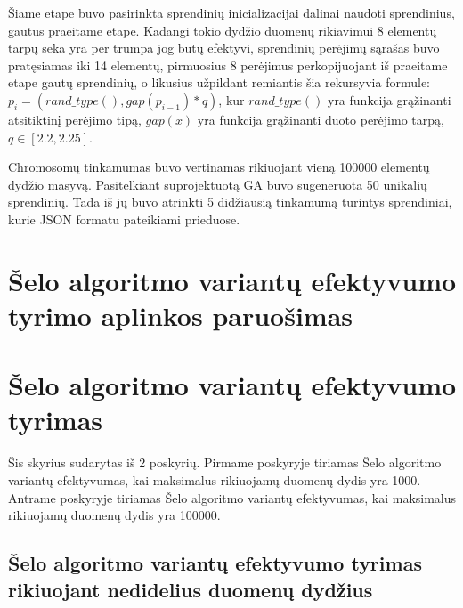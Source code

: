 \documentclass{VUMIFInfKursinis}
\begin{document}
Šiame etape buvo pasirinkta sprendinių inicializacijai dalinai naudoti sprendinius, gautus praeitame etape.
Kadangi tokio dydžio duomenų rikiavimui 8 elementų tarpų seka yra per trumpa jog būtų efektyvi,
sprendinių perėjimų sąrašas buvo pratęsiamas iki 14 elementų, pirmuosius 8 perėjimus perkopijuojant iš praeitame etape gautų sprendinių,
o likusius užpildant remiantis šia rekursyvia formule: $p_i = (rand\_type(), gap(p_{i-1}) * q)$,
kur $rand\_type()$ yra funkcija grąžinanti atsitiktinį perėjimo tipą, $gap(x)$ yra funkcija grąžinanti duoto perėjimo tarpą, $q \in \left[2.2, 2.25\right]$.

Chromosomų tinkamumas buvo vertinamas rikiuojant vieną 100000 elementų dydžio masyvą.
Pasitelkiant suprojektuotą GA buvo sugeneruota 50 unikalių sprendinių.
Tada iš jų buvo atrinkti 5 didžiausią tinkamumą turintys sprendiniai, kurie JSON formatu pateikiami prieduose. %

\section{Šelo algoritmo variantų efektyvumo tyrimo aplinkos paruošimas}

\section{Šelo algoritmo variantų efektyvumo tyrimas}

Šis skyrius sudarytas iš 2 poskyrių.
Pirmame poskyryje tiriamas Šelo algoritmo variantų efektyvumas, kai maksimalus rikiuojamų duomenų dydis yra 1000.
Antrame poskyryje tiriamas Šelo algoritmo variantų efektyvumas, kai maksimalus rikiuojamų duomenų dydis yra 100000.

\subsection{Šelo algoritmo variantų efektyvumo tyrimas rikiuojant nedidelius duomenų dydžius}
\end{document}
